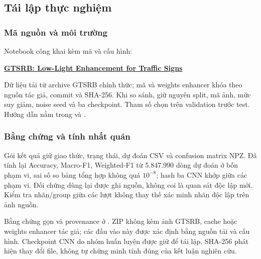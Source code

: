 \subsection{Tái lập thực nghiệm}
\subsubsection{Mã nguồn và môi trường}
Notebook công khai kèm mã và cấu hình:
\begin{center}
\href{https://www.kaggle.com/code/kieuthithutrang/gtsrb-low-light-enhancement-for-traffic-signs}{\textbf{GTSRB: Low-Light Enhancement for Traffic Signs}}
\end{center}
Dữ liệu tải từ archive GTSRB chính thức; mã và weights enhancer khóa theo nguồn tác giả, commit và SHA-256. Khi so sánh, giữ nguyên split, mã ảnh, mức suy giảm, noise seed và ba checkpoint. Tham số chọn trên validation trước test. Hướng dẫn nằm trong  và .

\subsubsection{Bằng chứng và tính nhất quán}
Gói kết quả giữ giao thức, trạng thái, dự đoán CSV và confusion matrix NPZ. Đã tính lại Accuracy, Macro-F1, Weighted-F1 từ 5.847.990 dòng dự đoán ở bốn phạm vi, sai số so bảng tổng hợp không quá $10^{-8}$; hash ba CNN khớp giữa các phạm vi. Đối chứng dùng lại được ghi nguồn, không coi là quan sát độc lập mới. Kiểm tra nhãn/group giữa các lượt không thay thế xác minh nhãn độc lập trên ảnh nguồn.

Bằng chứng gọn và provenance ở . ZIP không kèm ảnh GTSRB, cache hoặc weights enhancer tác giả; các đầu vào này được xác định bằng nguồn tải và cấu hình. Checkpoint CNN do nhóm huấn luyện được giữ để tái lập. SHA-256 phát hiện thay đổi file, không tự chứng minh tính đúng của kết luận nghiên cứu.

